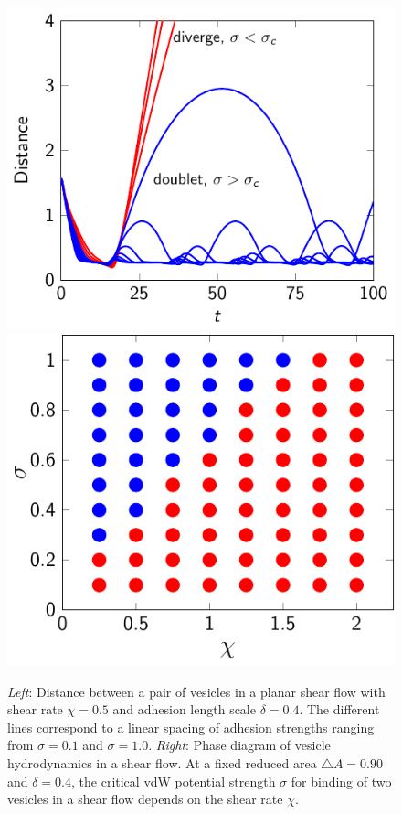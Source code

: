\documentclass[%
preprint,
 amsmath,amssymb,
 aps,
]{revtex4-1}
\begin{document}
\begin{figure}
  \includegraphics[height=0.4\textwidth]{figs/shear_adR4em1Chi1e0_ra-090.pdf}
  \includegraphics[height=0.4\textwidth]{figs/shear_adR4em1_ra090_phaseDiagram.pdf}
  \caption{{\em Left}: Distance between a pair of vesicles in a planar
    shear flow with shear rate $\chi=0.5$ and adhesion length scale
    $\delta = 0.4$.   The different lines correspond to a linear spacing
    of adhesion strengths ranging from $\sigma=0.1$ and $\sigma=1.0$.
    {\em Right}: Phase diagram of vesicle hydrodynamics in a shear flow.
    At a fixed reduced area $\triangle A=0.90$ and $\delta =0.4$,  the
    critical vdW potential strength $\sigma$ for binding of two vesicles
  in a shear flow depends on the shear rate $\chi$.
\label{fig:sflow_phase_diagram}}
\end{figure}

\end{document}
